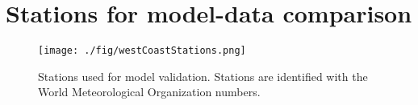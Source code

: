 \section{Stations for model-data comparison}\label{appendix:validation}

\begin{sidewaysfigure}
\texttt{[image: ./fig/westCoastStations.png]}
  \caption{Stations used for model validation. Stations are identified with the World Meteorological Organization numbers.}
  \label{fig:buoyMap}
\end{sidewaysfigure}